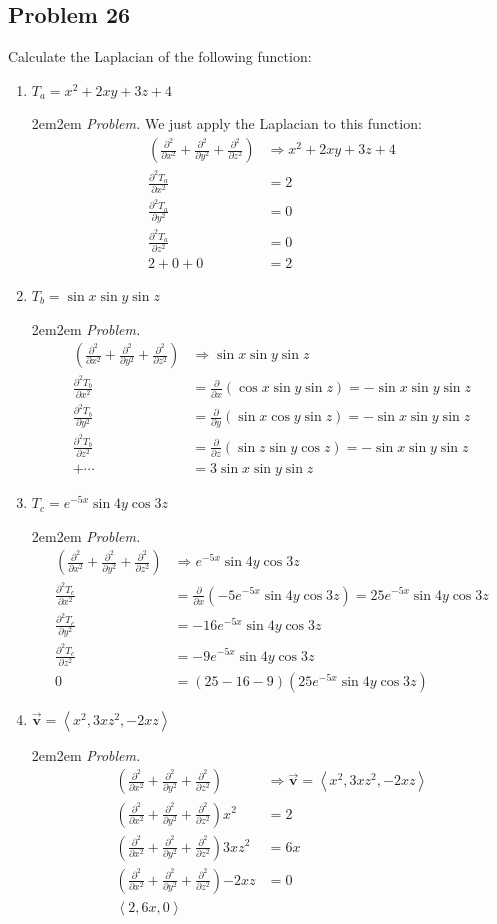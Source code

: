 \documentclass[10pt,oneside]{book}
\newcommand{\gspc}{\vspace{0.13cm}} %
\newcommand{\prt}[2]{\frac{\partial#1}{\partial#2}}
\let\endoldproof\endproof
\newenvironment{problem}[1]
  {\vspace{-0.1cm}\begin{coloredadjust}\begin{adjustwidth}{2em}{2em}
   \textit{Problem. }#1}
  {\endoldproof
\end{adjustwidth}\end{coloredadjust}\gspc}
\newcommand{\cpr}[1]{\left(#1\right)}
\newcommand{\pvec}[1]{\left\langle#1\right\rangle}
\newcommand{\vv}{\vec{\mathbf{v}}}
\begin{document}
\subsection*{Problem 26}
Calculate the Laplacian of the following function:
\newcommand{\laplace}{\prt{^2}{x^2}+\prt{^2}{y^2}+\prt{^2}{z^2}}
\newcommand{\prts}[2]{\prt{^2#1}{#2^2}}
\begin{enumerate}
  \item $T_a = x^2 + 2xy + 3z + 4$
  \begin{problem}
    We just apply the Laplacian to this function:
    \begin{align*}
      \cpr{\laplace}&\Rightarrow x^2 + 2xy+3z+4\\
      \prts{T_a}{x} &= 2\\
      \prts{T_a}{y}&= 0\\
      \prts{T_a}{z}&= 0\\
      2 + 0 + 0 &= 2
    \end{align*}
  \end{problem}
  \item $T_b = \sin x\sin y\sin z$
  \begin{problem}
    \begin{align*}
      \cpr{\laplace}&\Rightarrow\sin x\sin y\sin z\\
      \prts{T_b}{x}&= \prt{}{x}\cpr{\cos x\sin y\sin z} = -\sin x \sin y \sin z\\
      \prts{T_b}{y}&= \prt{}{y}\cpr{\sin x \cos y \sin z} = -\sin x \sin y \sin z\\
      \prts{T_b}{z}&= \prt{}{z}\cpr{\sin z \sin y\cos z} = -\sin x\sin y\sin z\\
      +\cdots &= 3\sin x\sin y \sin z
    \end{align*}
  \end{problem}
  \item $T_c = e^{-5x}\sin 4y\cos 3z$
  \begin{problem}
    \begin{align*}
      \cpr{\laplace}&\Rightarrow e^{-5x}\sin 4y\cos 3z\\
      \prts{T_c}{x}&= \prt{}{x}\cpr{-5e^{-5x}\sin 4y\cos 3z}= 25e^{-5x}\sin 4y\cos 3z\\
      \prts{T_c}{y}&= -16e^{-5x}\sin 4y\cos 3z\\
      \prts{T_c}{z}&= -9e^{-5x}\sin 4y\cos 3z\\
      0&= (25 -16 - 9)(25e^{-5x}\sin 4y\cos 3z)
    \end{align*}
  \end{problem}
  \pagebreak
  \item $\vv = \pvec{x^2, 3xz^2, -2xz}$
  \begin{problem}
    \begin{align*}
      \cpr{\laplace}&\Rightarrow \vv = \pvec{x^2, 3xz^2, -2xz}\\
      \cpr{\laplace}{x^2}&= 2\\
      \cpr{\laplace}{3xz^2}&= 6x\\
      \cpr{\laplace}{-2xz}&= 0\\
      \pvec{2, 6x, 0}
    \end{align*}
  \end{problem}
\end{enumerate}
\end{document}
